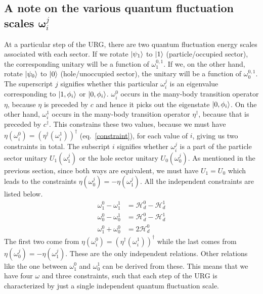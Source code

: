 \documentclass[twoside,11pt]{report}
\numberwithin{equation}{section}
\begin{document}
\subsection{A note on the various quantum fluctuation scales \(\pmb\omega_i^j\)}
At a particular step of the URG, there are two quantum fluctuation energy scales associated with each sector. If we rotate \(\ket{\psi_1}\) to \(\ket{1}\) (particle/occupied sector), the corresponding unitary will be a function of \(\omega_1^{0,1}\). If we, on the other hand, rotate \(\ket{\psi_0}\) to \(\ket{0}\) (hole/unoccupied sector), the unitary will be a function of \(\omega_0^{0,1}\). The superscript \(j\) signifies whether this particular \(\omega_i^j\) is an eigenvalue corresponding to \(\ket{1,\phi_i}\) or \(\ket{0,\phi_i}\). \(\omega^0_i\) occurs in the many-body transition operator \(\eta\), because \(\eta\) is preceded by \(c\) and hence it picks out the eigenstate \(\ket{0,\phi_i}\). On the other hand, \(\omega^1_i\) occurs in the many-body transition operator \(\eta^\dagger\), because that is preceded by \(c^\dagger\). This constrains these two values, because we must have \(\eta(\omega_i^0) = \left(\eta^\dagger(\omega_i^1)\right)^\dagger\) (eq.~\ref{constraint}), for each value of \(i\), giving us two constraints in total. The subscript \(i\) signifies whether \(\omega_i^j\) is a part of the particle sector unitary \(U_1(\omega_1^j)\) or the hole sector unitary \(U_0(\omega_0^j)\). As mentioned in the previous section, since both ways are equivalent, we must have \(U_1 = U_0\) which leads to the constraints \(\eta(\omega_0^j) = -\eta(\omega_1^j)\). All the independent constraints are listed below.
\begin{equation}\begin{aligned}
	\label{omegarel}
\omega_1^0 - \omega_1^1 &=\mathcal{H}_d^0 - \mathcal{H}_d^1\\
\omega_0^0 - \omega_0^1 &= \mathcal{H}_d^0 - \mathcal{H}_d^1\\
\omega_1^0 + \omega_0^0 &= 2\mathcal{H}_d^0
\end{aligned}\end{equation}
The first two come from \(\eta(\omega_i^0) = \left(\eta^\dagger(\omega_i^1)\right)^\dagger\) while the last comes from \(\eta(\omega_0^j) = -\eta(\omega_1^j)\). These are the only independent relations. Other relations like the one between \(\omega_1^0\) and \(\omega_0^1\) can be derived from these. This means that we have four \(\omega\) and three constraints, such that each step of the URG is characterized by just a single independent quantum fluctuation scale.
\end{document}
